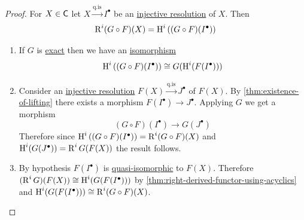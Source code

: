\documentclass[../../main]{subfiles}
\begin{document}
\begin{proof}
  For \(X \in \mathsf{C}\) let \(X \xrightarrow{\text{q.is}} I^{\bullet}\) be an \hyperref[def:resolution]{injective resolution} of \(X\).
  Then
  \begin{equation*}
    \operatorname{R}^{i}(G \circ F)(X) = \operatorname{H}^{i}\left( (G \circ F)(I^{\bullet}) \right)
  \end{equation*}
  \begin{enumerate}
    \item If \(G\) is \hyperref[def:exact-functor]{exact} then we have an \hyperref[def:categorical-isomorphism]{isomorphism}
          \begin{equation*}
            \operatorname{H}^{i} \left( (G \circ F)(I^{\bullet}) \right) \cong G(\operatorname{H}^{i}(F(I^{\bullet})))
          \end{equation*}
    \item Consider an \hyperref[def:resolution]{injective resolution} \(F(X) \xrightarrow{\text{q.is}} J^{\bullet}\) of \(F(X)\).
          By \autoref{thm:existence-of-lifting} there exists a morphism \(F(I^{\bullet}) \to J^{\bullet}\).
          Applying \(G\) we get a morphism
          \begin{equation*}
            \left( G \circ F \right)(I^{\bullet}) \to G(J^{\bullet})
          \end{equation*}
          Therefore since \(\operatorname{H}^{i} \left( (G \circ F)(I^{\bullet}) \right) = \operatorname{R}^{i}(G \circ F)(X)\) and \(\operatorname{H}^{i}(G(J^{\bullet})) = \operatorname{R}^{i}G(F(X))\) the result follows.
    \item By hypothesis \(F(I^{\bullet})\) is \hyperref[def:quasi-isomorphism]{quasi-isomorphic} to \(F(X)\).
          Therefore \((\operatorname{R}^{i}G)(F(X)) \cong \operatorname{H}^{i}(G(F(I^{\bullet})))\) by \autoref{thm:right-derived-functor-using-acyclics} and \(\operatorname{H}^{i}(G(F(I^{\bullet}))) \cong \operatorname{R}^{i}(G \circ F)(X)\). \qedhere
  \end{enumerate}
\end{proof}
\end{document}
